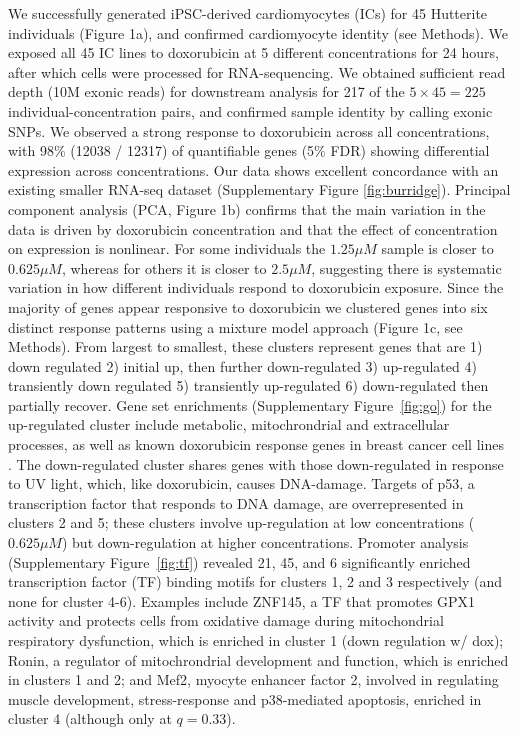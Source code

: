\documentclass{article}
\begin{document}
{We successfully generated iPSC-derived cardiomyocytes (ICs) for 45 Hutterite individuals (Figure 1a), and confirmed cardiomyocyte identity (see Methods). We exposed all 45 IC lines to doxorubicin at 5 different concentrations for 24 hours, after which cells were processed for RNA-sequencing. We obtained sufficient read depth (10M exonic reads) for downstream analysis for 217 of the $5 \times 45 = 225$ individual-concentration pairs, and confirmed sample identity by calling exonic SNPs. We observed a strong response to doxorubicin across all concentrations, with 98\% (12038 / 12317) of quantifiable genes (5\% FDR) showing differential expression across concentrations. Our data shows excellent concordance with an existing smaller RNA-seq dataset\cite{Burridge2016} (Supplementary Figure \ref{fig:burridge}). Principal component analysis (PCA, Figure 1b) confirms that the main variation in the data is driven by doxorubicin concentration and that the effect of concentration on expression is nonlinear. For some individuals the $1.25\mu M$ sample is closer to $0.625 \mu M$, whereas for others it is closer to $2.5\mu M$, suggesting there is systematic variation in how different individuals respond to doxorubicin exposure. Since the majority of genes appear responsive to doxorubicin we clustered genes into six distinct response patterns using a mixture model approach (Figure 1c, see Methods). From largest to smallest, these clusters represent genes that are 1) down regulated 2) initial up, then further down-regulated 3) up-regulated 4) transiently down regulated 5) transiently up-regulated 6) down-regulated then partially recover. Gene set enrichments (Supplementary Figure~\ref{fig:go}) for the up-regulated cluster include metabolic, mitochrondrial and extracellular processes, as well as known doxorubicin response genes in breast cancer cell lines \cite{graessmann2007chemotherapy}. The down-regulated cluster shares genes with those down-regulated in response to UV light, which, like doxorubicin, causes DNA-damage. Targets of p53, a transcription factor that responds to DNA damage, are overrepresented in clusters 2 and 5; these clusters involve up-regulation at low concentrations ($0.625\mu M$) but down-regulation at higher concentrations. Promoter analysis (Supplementary Figure~\ref{fig:tf}) revealed 21, 45, and 6 significantly enriched transcription factor (TF) binding motifs for clusters 1, 2 and 3 respectively (and none for cluster 4-6). Examples include ZNF145, a TF that promotes GPX1 activity and protects cells from oxidative damage during mitochondrial respiratory dysfunction\cite{Lu2012}, which is enriched in cluster 1 (down regulation w/ dox); Ronin, a regulator of mitochrondrial development and function\cite{Poche2016}, which is enriched in clusters 1 and 2; and Mef2, myocyte enhancer factor 2, involved in regulating muscle development, stress-response and p38-mediated apoptosis\cite{Zarubin2005}, enriched in cluster 4 (although only at $q=0.33$).

}
\end{document}
